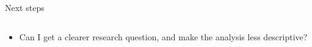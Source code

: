 \documentclass[9pt]{beamer}
\begin{document}
\begin{frame}{Next steps}

\begin{columns}
	\begin{column}{0.7\linewidth}
		\begin{center}
			\begin{itemize}
				\item Can I get a clearer research question, and make the analysis less descriptive?
			\end{itemize}
		\end{center}
	\end{column}
\end{columns}

\end{frame}
\end{document}
